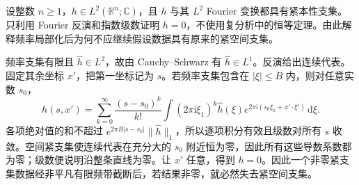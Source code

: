 \begin{optionalexercise}\label{b2:ex:11-bandlimited-support}
设整数 \(n\geq1\)，\(h\in L^2(\mathbb R^n;\mathbb C)\)，且 \(h\) 与其 \(L^2\) Fourier 变换都具有紧本性支集。只利用 Fourier 反演和指数级数证明 \(h=0\)，不使用复分析中的恒等定理。由此解释频率局部化后为何不应继续假设数据具有原来的紧空间支集。
\end{optionalexercise}
\begin{solution}
频率支集有限且 \(\widehat h\in L^2\)，故由 Cauchy--Schwarz 有 \(\widehat h\in L^1\)。反演给出连续代表。固定其余坐标 \(x'\)，把第一坐标记为 \(s\)。若频率支集包含在 \(|\xi|\leq B\) 内，则对任意实数 \(s_0\)，
\[
 h(s,x')=\sum_{k=0}^\infty\dfrac{(s-s_0)^k}{k!}
 \int(2\pi\mathrm{i}\xi_1)^k\widehat h(\xi)
       e^{2\pi\mathrm{i}(s_0\xi_1+x'\cdot\xi')}\,\mathrm{d}\xi.
\]
各项绝对值的和不超过 \(e^{2\pi B|s-s_0|}\|\widehat h\|_1\)，所以逐项积分有效且级数对所有 \(s\) 收敛。空间紧支集使连续代表在充分大的 \(s_0\) 附近恒为零，因此所有这些导数系数都为零；级数便说明沿整条直线为零。让 \(x'\) 任意，得到 \(h=0\)。因此一个非零紧支集数据经非平凡有限频带截断后，若结果非零，就必然失去紧空间支集。
\end{solution}

